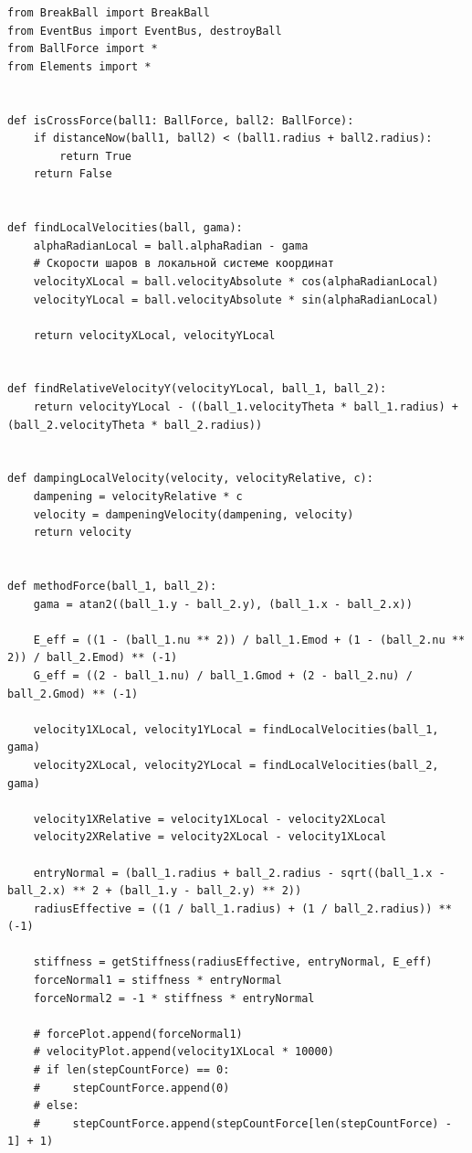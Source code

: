 \documentclass[utf8x, 14pt, oneside, a4paper]{article}
\begin{document}
\begin{lstlisting}
from BreakBall import BreakBall
from EventBus import EventBus, destroyBall
from BallForce import *
from Elements import *


def isCrossForce(ball1: BallForce, ball2: BallForce):
    if distanceNow(ball1, ball2) < (ball1.radius + ball2.radius):
        return True
    return False


def findLocalVelocities(ball, gama):
    alphaRadianLocal = ball.alphaRadian - gama
    # Скорости шаров в локальной системе координат
    velocityXLocal = ball.velocityAbsolute * cos(alphaRadianLocal)
    velocityYLocal = ball.velocityAbsolute * sin(alphaRadianLocal)

    return velocityXLocal, velocityYLocal


def findRelativeVelocityY(velocityYLocal, ball_1, ball_2):
    return velocityYLocal - ((ball_1.velocityTheta * ball_1.radius) + (ball_2.velocityTheta * ball_2.radius))


def dampingLocalVelocity(velocity, velocityRelative, c):
    dampening = velocityRelative * c
    velocity = dampeningVelocity(dampening, velocity)
    return velocity


def methodForce(ball_1, ball_2):
    gama = atan2((ball_1.y - ball_2.y), (ball_1.x - ball_2.x))

    E_eff = ((1 - (ball_1.nu ** 2)) / ball_1.Emod + (1 - (ball_2.nu ** 2)) / ball_2.Emod) ** (-1)
    G_eff = ((2 - ball_1.nu) / ball_1.Gmod + (2 - ball_2.nu) / ball_2.Gmod) ** (-1)

    velocity1XLocal, velocity1YLocal = findLocalVelocities(ball_1, gama)
    velocity2XLocal, velocity2YLocal = findLocalVelocities(ball_2, gama)

    velocity1XRelative = velocity1XLocal - velocity2XLocal
    velocity2XRelative = velocity2XLocal - velocity1XLocal

    entryNormal = (ball_1.radius + ball_2.radius - sqrt((ball_1.x - ball_2.x) ** 2 + (ball_1.y - ball_2.y) ** 2))
    radiusEffective = ((1 / ball_1.radius) + (1 / ball_2.radius)) ** (-1)

    stiffness = getStiffness(radiusEffective, entryNormal, E_eff)
    forceNormal1 = stiffness * entryNormal
    forceNormal2 = -1 * stiffness * entryNormal

    # forcePlot.append(forceNormal1)
    # velocityPlot.append(velocity1XLocal * 10000)
    # if len(stepCountForce) == 0:
    #     stepCountForce.append(0)
    # else:
    #     stepCountForce.append(stepCountForce[len(stepCountForce) - 1] + 1)


\end{lstlisting}
\end{document}
